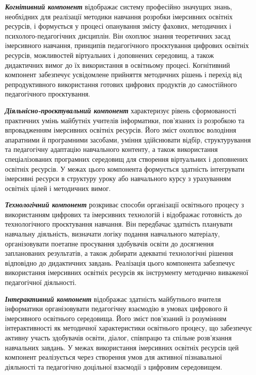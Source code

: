 \emph{\textbf{Когнітивний компонент}} відображає систему професійно значущих знань, необхідних для реалізації методики навчання розробки імерсивних освітніх ресурсів, і формується у процесі опанування змісту фахових, методичних і психолого-педагогічних дисциплін. Він охоплює знання теоретичних засад імерсивного навчання, принципів педагогічного проєктування цифрових освітніх ресурсів, можливостей віртуальних і доповнених середовищ, а також дидактичних вимог до їх використання в освітньому процесі. Когнітивний компонент забезпечує усвідомлене прийняття методичних рішень і перехід від репродуктивного використання готових цифрових продуктів до самостійного педагогічного проєктування.

\emph{\textbf{Діяльнісно-проєктувальний компонент}} характеризує рівень сформованості практичних умінь майбутніх учителів інформатики, пов'язаних із розробкою та впровадженням імерсивних освітніх ресурсів. Його зміст охоплює володіння апаратними й програмними засобами, уміння здійснювати відбір, структурування та педагогічну адаптацію навчального контенту, а також використання спеціалізованих програмних середовищ для створення віртуальних і доповнених освітніх ресурсів. У межах цього компонента формується здатність інтегрувати імерсивні ресурси в структуру уроку або навчального курсу з урахуванням освітніх цілей і методичних вимог.

\emph{\textbf{Технологічний компонент}} розкриває способи організації освітнього процесу з використанням цифрових та імерсивних технологій і відображає готовність до технологічного проєктування навчання. Він передбачає здатність планувати навчальну діяльність, визначати логіку подання навчального матеріалу, організовувати поетапне просування здобувачів освіти до досягнення запланованих результатів, а також добирати адекватні технологічні рішення відповідно до дидактичних завдань. Реалізація цього компонента забезпечує використання імерсивних освітніх ресурсів як інструменту методично виваженої педагогічної діяльності.

\emph{\textbf{Інтерактивний компонент}} відображає здатність майбутнього вчителя інформатики організовувати педагогічну взаємодію в умовах цифрового й імерсивного освітнього середовища. Його зміст пов'язаний із розумінням інтерактивності як методичної характеристики освітнього процесу, що забезпечує активну участь здобувачів освіти, діалог, співпрацю та спільне розв'язання навчальних завдань. У межах використання імерсивних освітніх ресурсів цей компонент реалізується через створення умов для активної пізнавальної діяльності та педагогічно доцільної взаємодії з цифровим середовищем.

